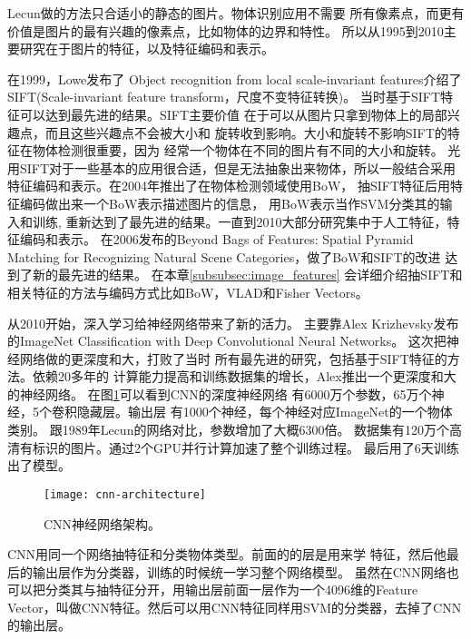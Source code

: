 Lecun做的方法只合适小的静态的图片。物体识别应用不需要
所有像素点，而更有价值是图片的最有兴趣的像素点，比如物体的边界和特性。
所以从1995到2010主要研究在于图片的特征，以及特征编码和表示。

在1999，Lowe发布了
Object recognition from local scale-invariant features介绍了
SIFT(Scale-invariant feature transform，尺度不变特征转换)。\cite{lowe1999object,lowe2004distinctive}
当时基于SIFT特征可以达到最先进的结果。SIFT主要价值
在于可以从图片只拿到物体上的局部兴趣点，而且这些兴趣点不会被大小和
旋转收到影响。大小和旋转不影响SIFT的特征在物体检测很重要，因为
经常一个物体在不同的图片有不同的大小和旋转。
光用SIFT对于一些基本的应用很合适，但是无法抽象出来物体，所以一般结合采用
特征编码和表示。在2004年推出了在物体检测领域使用BoW，
抽SIFT特征后用特征编码做出来一个BoW表示描述图片的信息，
用BoW表示当作SVM分类其的输入和训练,\cite{csurka2004visual}
重新达到了最先进的结果。一直到2010大部分研究集中于人工特征，特征编码和表示。
在2006发布的Beyond Bags of Features: Spatial Pyramid Matching
for Recognizing Natural Scene Categories，做了BoW和SIFT的改进
达到了新的最先进的结果。 \cite{lazebnik2006beyond}
在本章\ref{subsubsec:image_features}
会详细介绍抽SIFT和相关特征的方法与编码方式比如BoW，VLAD和Fisher Vectors。

从2010开始，深入学习给神经网络带来了新的活力。
主要靠Alex Krizhevsky发布的ImageNet Classification with Deep Convolutional Neural Networks。
这次把神经网络做的更深度和大，打败了当时
所有最先进的研究，包括基于SIFT特征的方法。依赖20多年的
计算能力提高和训练数据集的增长，Alex推出一个更深度和大的神经网络。
在图\ref{fig:cnn-architecture}可以看到CNN的深度神经网络
有6000万个参数，65万个神经，5个卷积隐藏层。输出层
有1000个神经，每个神经对应ImageNet的一个物体类别。
跟1989年Lecun的网络对比，参数增加了大概6300倍。
数据集有120万个高清有标识的图片。通过2个GPU并行计算加速了整个训练过程。
最后用了6天训练出了模型。\cite{krizhevsky2012imagenet,lee2009convolutional}
\begin{figure}[H]
  \centering
    \texttt{[image: cnn-architecture]}
  \caption{CNN神经网络架构。\cite{krizhevsky2012imagenet}}
  \label{fig:cnn-architecture}
\end{figure}

CNN用同一个网络抽特征和分类物体类型。前面的的层是用来学
特征，然后他最后的输出层作为分类器，训练的时候统一学习整个网络模型。
虽然在CNN网络也可以把分类其与抽特征分开，用输出层前面一层作为一个4096维的Feature 
Vector，叫做CNN特征。然后可以用CNN特征同样用SVM的分类器，去掉了CNN的输出层。
\cite{razavian2014cnn}

